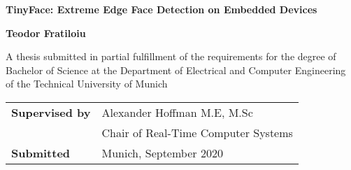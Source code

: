    \begin{center}
        \vspace*{1cm}
        \begin{flushleft}
            \Huge
            \textbf{TinyFace: Extreme Edge Face Detection on Embedded Devices}
            
            \vspace{5 pt}
            
            \vspace{120 pt}
            \huge
            \textbf{Teodor Fratiloiu}
            
            \vspace{120 pt}
            
            \large
            A thesis submitted in partial fulfillment of the requirements for the degree of Bachelor of Science at the Department of Electrical and Computer Engineering \\ of the Technical University of Munich
            
            
            \vspace{100 pt}
            
            \begin{tabular}{ l l }
                 \textbf{Supervised by\hspace{75 pt}} & Alexander Hoffman M.E, M.Sc \\  
                                        & Chair of Real-Time Computer Systems \\
                 \textbf{Submitted \hspace{75 pt}} & Munich, September 2020    
            \end{tabular}
         
        \end{flushleft}
   \end{center}